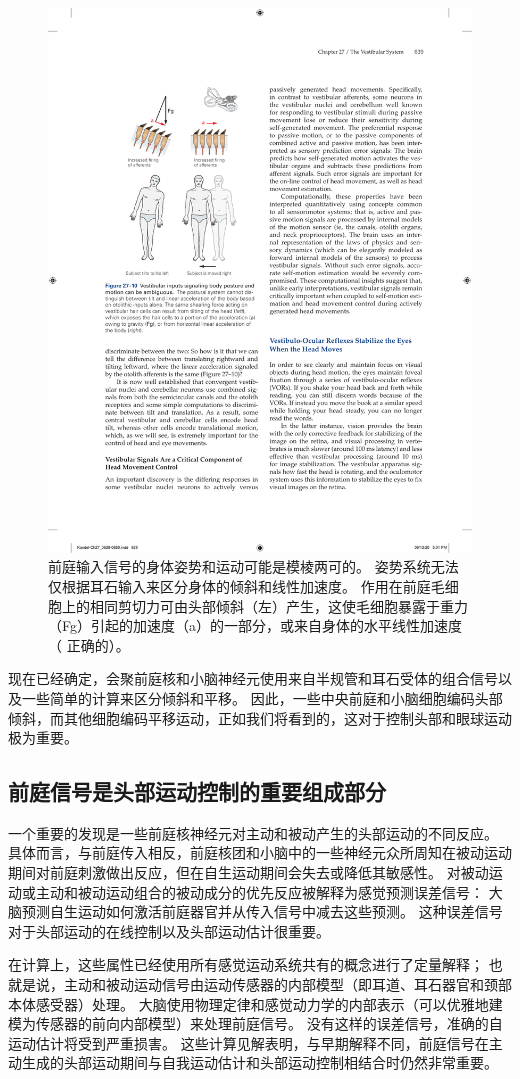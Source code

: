 \begin{figure}[htbp]
	\centering
	\includegraphics[width=0.5\linewidth]{chap27/fig_27_10}
	\caption{前庭输入信号的身体姿势和运动可能是模棱两可的。 姿势系统无法仅根据耳石输入来区分身体的倾斜和线性加速度。 作用在前庭毛细胞上的相同剪切力可由头部倾斜（左）产生，这使毛细胞暴露于重力（Fg）引起的加速度（a）的一部分，或来自身体的水平线性加速度（ 正确的）。}
	\label{fig:27_10}
\end{figure}


现在已经确定，会聚前庭核和小脑神经元使用来自半规管和耳石受体的组合信号以及一些简单的计算来区分倾斜和平移。
因此，一些中央前庭和小脑细胞编码头部倾斜，而其他细胞编码平移运动，正如我们将看到的，这对于控制头部和眼球运动极为重要。



\subsection{前庭信号是头部运动控制的重要组成部分}

一个重要的发现是一些前庭核神经元对主动和被动产生的头部运动的不同反应。
具体而言，与前庭传入相反，前庭核团和小脑中的一些神经元众所周知在被动运动期间对前庭刺激做出反应，但在自生运动期间会失去或降低其敏感性。
对被动运动或主动和被动运动组合的被动成分的优先反应被解释为感觉预测误差信号：
大脑预测自生运动如何激活前庭器官并从传入信号中减去这些预测。
这种误差信号对于头部运动的在线控制以及头部运动估计很重要。


在计算上，这些属性已经使用所有感觉运动系统共有的概念进行了定量解释；
也就是说，主动和被动运动信号由运动传感器的内部模型（即耳道、耳石器官和颈部本体感受器）处理。
大脑使用物理定律和感觉动力学的内部表示（可以优雅地建模为传感器的前向内部模型）来处理前庭信号。
没有这样的误差信号，准确的自运动估计将受到严重损害。
这些计算见解表明，与早期解释不同，前庭信号在主动生成的头部运动期间与自我运动估计和头部运动控制相结合时仍然非常重要。



